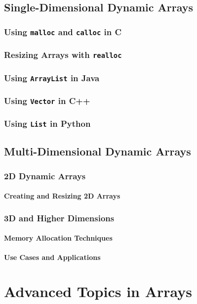 \documentclass[12pt, oneside]{book}
\begin{document}
	\section{Single-Dimensional Dynamic Arrays}
	\subsection{Using \texttt{malloc} and \texttt{calloc} in C}
	\subsection{Resizing Arrays with \texttt{realloc}}
	\subsection{Using \texttt{ArrayList} in Java}
	\subsection{Using \texttt{Vector} in C++}
	\subsection{Using \texttt{List} in Python}
	
	\section{Multi-Dimensional Dynamic Arrays}
	\subsection{2D Dynamic Arrays}
	\subsubsection{Creating and Resizing 2D Arrays}
	\subsection{3D and Higher Dimensions}
	\subsubsection{Memory Allocation Techniques}
	\subsubsection{Use Cases and Applications}
	
\chapter{Advanced Topics in Arrays}
\end{document}
